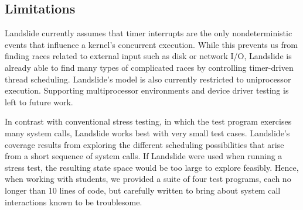 \subsection{Limitations}

Landslide currently assumes that timer interrupts are the only nondeterministic events that influence a kernel's concurrent execution. While this prevents us from finding races related to external input such as disk or network I/O, Landslide is already able to find many types of complicated races by controlling timer-driven thread scheduling.
Landslide's model is also currently restricted to uniprocessor execution.
Supporting multiprocessor environments and device driver testing is left to future work.

In contrast with conventional stress testing, in which the test program exercises many system calls, Landslide works best with very small test cases.
Landslide's coverage results from exploring the different scheduling possibilities that arise from a short sequence of system calls.
If Landslide were used when running a stress test, the resulting state space would be too large to explore feasibly.
Hence, when working with students, we provided a suite of four test programs, each no longer than 10 lines of code, but carefully written to bring about system call interactions known to be troublesome.


